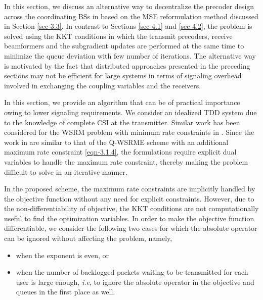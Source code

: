 In this section, we discuss an alternative way to decentralize the precoder design across the coordinating \acp{BS} in  based on the \ac{MSE} reformulation method discussed in Section \ref{sec-3.3}. In contrast to Sections \ref{sec-4.1} and \ref{sec-4.2}, the problem is solved using the \ac{KKT} conditions in which the transmit precoders, receive beamformers and the subgradient updates are performed at the same time to minimize the queue deviation with few number of iterations. The alternative way is motivated by the fact that distributed approaches presented in the preceding sections may not be efficient for large systems in terms of signaling overhead involved in exchanging the coupling variables and the receivers.

In this section, we provide an algorithm that can be of practical importance owing to lower signaling requirements. We consider an idealized \ac{TDD} system due to the knowledge of complete \ac{CSI} at the transmitter. Similar work has been considered for the \ac{WSRM} problem with minimum rate constraints in \cite{kaleva2013decentralized}. Since the work in \cite{kaleva2013decentralized} are similar to that of the \ac{Q-WSRME} scheme with an additional maximum rate constraint \eqref{eqn-3.1.4}, the formulations require explicit dual variables to handle the maximum rate constraint, thereby making the problem difficult to solve in an iterative manner.

In the proposed scheme, the maximum rate constraints are implicitly handled by the objective function without any need for explicit constraints. However, due to the non-differentiability of objective, the \ac{KKT} conditions are not computationally useful to find the optimization variables. In order to make the objective function differentiable, we consider the following two cases for which the absolute operator can be ignored without affecting the problem, namely,
\begin{itemize}
\item when the exponent  is even, or
\item when the number of backlogged packets waiting to be transmitted for each user is large enough, \textit{i.e},  to ignore the absolute operator in the objective and queues in the first place as well.
\end{itemize}

